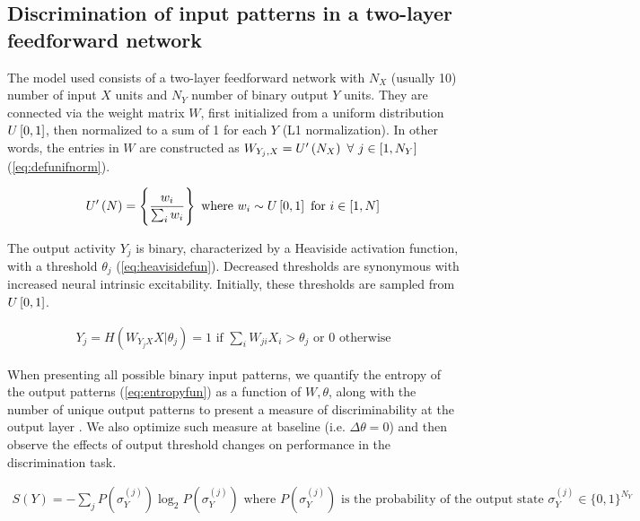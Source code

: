 \subsection{Discrimination of input patterns in a two-layer feedforward network}

The model used consists of a two-layer feedforward network
        with $N_X$ (usually 10) number of input $X$ units
        and $N_Y$ number of binary output $Y$ units.
    They are connected via the weight matrix $W$,
        first initialized from a uniform distribution $U\left[0,1\right]$,
        then normalized to a sum of 1 for each $Y$ (L1 normalization).
    In other words, the entries in $W$ are constructed as
        $W_{Y_j,X} = U^{\prime}\left(N_X\right) \ \forall \ j \in [1, N_Y]$
        (\autoref{eq:defunifnorm}).

\vspace{-1em}
\begin{align}
    U^{\prime}\left(N\right) = \left\{
            \dfrac{w_i}{\sum_i w_i}
            \right\}
        \text{ where } w_i \sim U\left[0,1\right]
        \text{ for }
        i \in [1, N]
    \label{eq:defunifnorm}
\end{align}

The output activity $Y_j$ is binary,
        characterized by a Heaviside activation function,
        with a threshold $\theta_j$ (\autoref{eq:heavisidefun}).
    Decreased thresholds are synonymous with increased neural intrinsic excitability.
    Initially, these thresholds are sampled from $U\left[0,1\right]$.

\vspace{-1em}
\begin{align}
    Y_j = H(W_{Y_j X} X | \theta_j) =
    1 \text{  if  } \sum_i W_{ji} X_i > \theta_j
    \text{ or } 0 \text{  otherwise}
    \label{eq:heavisidefun}
\end{align}

When presenting all possible binary input patterns,
        we quantify the entropy of the output patterns (\autoref{eq:entropyfun}) as a function of $W, \theta$,
        along with the number of unique output patterns
        to present a measure of discriminability at the output layer
        .
    We also optimize such measure at baseline (i.e. $\Delta \theta = 0$)
        and then observe the effects of output threshold changes on performance in the discrimination task.


\vspace{-1em}
\begin{align}
    S(Y) = - \sum_j
        P\left(\sigma_Y^{(j)}\right)
        \log_2 P\left(\sigma_Y^{(j)}\right)
    \text{ where } P\left(\sigma_Y^{(j)}\right)
    \text{ is the probability of the output state }
    \sigma_Y^{(j)} \in \{0,1\}^{N_Y}
    \label{eq:entropyfun}
\end{align}



